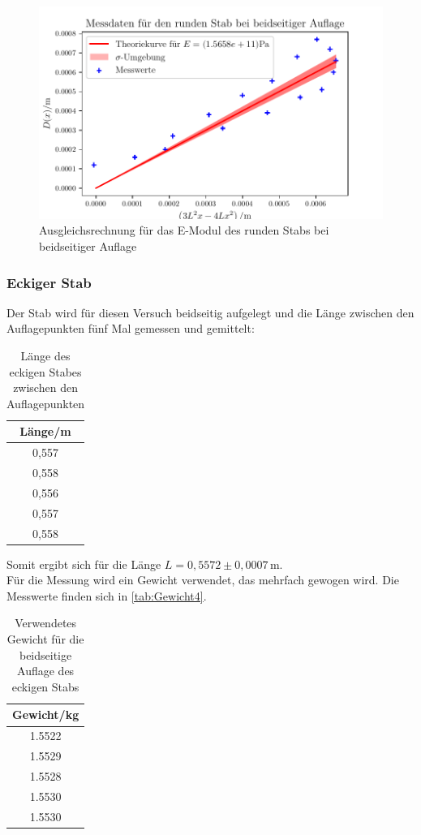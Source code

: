   \begin{figure}
    \centering
    \includegraphics{build/plot4.pdf}
    \caption{Ausgleichsrechnung für das E-Modul des runden Stabs bei beidseitiger Auflage}
    \label{fig:Messwerte3}
  \end{figure}
  \newpage

\subsubsection{Eckiger Stab}
  Der Stab wird für diesen Versuch beidseitig aufgelegt und die Länge zwischen den Auflagepunkten fünf Mal gemessen und gemittelt:

  \begin{table}
    \centering
    \caption{Länge des eckigen Stabes zwischen den Auflagepunkten}
    \label{tab:beidseitig_eckiger_Laenge}
    \begin{tabular}{c}
      \toprule
      Länge/m \\
      \midrule
      0,557 \\
      0,558 \\
      0,556 \\
      0,557 \\
      0,558 \\
      \bottomrule
    \end{tabular}
  \end{table}

  Somit ergibt sich für die Länge $L = 0{,}5572 \pm 0,0007 \, \mathrm{m}$.\\

  Für die Messung wird ein Gewicht verwendet, das mehrfach gewogen wird. Die Messwerte finden sich in \autoref{tab:Gewicht4}.

  \begin{table}
    \centering
    \caption{Verwendetes Gewicht für die beidseitige Auflage des eckigen Stabs}
    \label{tab:Gewicht4}
    \begin{tabular}{c}
      \toprule
      Gewicht/kg \\
      \midrule
      1.5522\\
      1.5529 \\
      1.5528 \\
      1.5530 \\
      1.5530  \\
      \bottomrule
    \end{tabular}
  \end{table}

